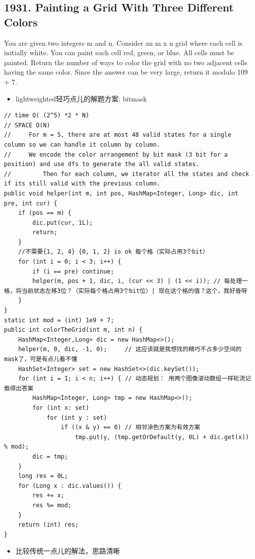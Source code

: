 \documentclass[9pt, b5paper]{article}
\begin{document}
\subsection{1931. Painting a Grid With Three Different Colors}
\label{sec-4-5}
You are given two integers m and n. Consider an m x n grid where each cell is initially white. You can paint each cell red, green, or blue. All cells must be painted.
Return the number of ways to color the grid with no two adjacent cells having the same color. Since the answer can be very large, return it modulo 109 + 7.
\begin{itemize}
\item lightweighted轻巧点儿的解题方案: bitmask
\end{itemize}
\begin{verbatim}
// time O( (2^5) *2 * N)
// SPACE O(N)
//     For m = 5, there are at most 48 valid states for a single column so we can handle it column by column.
//     We encode the color arrangement by bit mask (3 bit for a position) and use dfs to generate the all valid states.
//         Then for each column, we iterator all the states and check if its still valid with the previous column.
public void helper(int m, int pos, HashMap<Integer, Long> dic, int pre, int cur) {
    if (pos == m) {
        dic.put(cur, 1L);
        return;
    }
    //不需要{1, 2, 4} {0, 1, 2} is ok 每个格（实际占用3个bit）
    for (int i = 0; i < 3; i++) {
        if (i == pre) continue;
        helper(m, pos + 1, dic, i, (cur << 3) | (1 << i)); // 每处理一格，将当前状态左移3位？（实际每个格占用3个bit位）| 现在这个格的值？这个，我好昏呀
    }
}
static int mod = (int) 1e9 + 7;
public int colorTheGrid(int m, int n) {
    HashMap<Integer,Long> dic = new HashMap<>();
    helper(m, 0, dic, -1, 0);     // 这应该就是我想找的精巧不占多少空间的mask了，可是有点儿看不懂
    HashSet<Integer> set = new HashSet<>(dic.keySet());
    for (int i = 1; i < n; i++) { // 动态规划： 用两个图像滚动数组一样轮流记载得出答案
        HashMap<Integer, Long> tmp = new HashMap<>();
        for (int x: set) 
            for (int y : set) 
                if ((x & y) == 0) // 相邻涂色方案为有效方案
                    tmp.put(y, (tmp.getOrDefault(y, 0L) + dic.get(x)) % mod);
        dic = tmp;
    }
    long res = 0L;
    for (Long x : dic.values()) {
        res += x;
        res %= mod;
    }
    return (int) res;
}
\end{verbatim}
\begin{itemize}
\item 比较传统一点儿的解法，思路清晰
\end{itemize}
\end{document}
